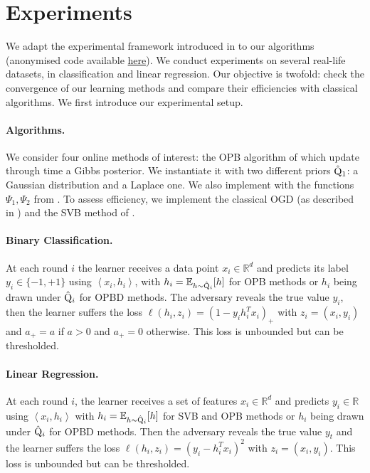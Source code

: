\section{Experiments}
\label{sec: experiments}

We adapt the experimental framework introduced in \citet[Sec.5]{cherief2019generalization} to our algorithms (anonymised code available \href{https://anonymous.4open.science/r/Online-PAC-Bayes-learning-044F}{here}). We conduct experiments on several real-life datasets, in classification and
linear regression. Our objective is twofold: check the convergence of our learning methods and compare their efficiencies with classical algorithms. We first introduce our experimental setup.

\paragraph{Algorithms.}
We consider four online methods of interest: the OPB algorithm of  which update through time a Gibbs posterior. We instantiate it with two different priors $\hat{\mathrm{Q}}_1$: a Gaussian distribution and a Laplace one. We also implement  with the functions $\Psi_1,\Psi_2$ from .
To assess efficiency, we implement the classical OGD (as described in \citealp[Alg. 1 of][]{zinkevich2003online}) and the SVB method of \citet{cherief2019generalization}.

\paragraph{Binary Classification.} At each round $i$ the learner receives a data point $x_{i} \in \mathbb{R}^{d}$ and predicts its label $y_{i} \in\{-1,+1\}$ using $\left\langle x_{i}, h_{i}\right\rangle$, with $h_i= \mathbb{E}_{h\sim \hat{\mathrm{Q}}_i}[h]$ for OPB methods or $h_i$ being drawn under $\hat{\mathrm{Q}}_i$ for OPBD methods.
The adversary reveals the true value $y_{i}$, then the learner suffers the loss $\ell(h_i,z_i)=\left(1-y_{i} h_{i}^{T} x_{i}\right)_{+}$ with $z_i=(x_i,y_i)$ and $a_{+}=a$ if $a>0$ and $a_{+}=0$ otherwise. This loss is unbounded but can be thresholded.


\paragraph{Linear Regression.} At each round $i$, the learner receives a set of features $x_{i} \in \mathbb{R}^{d}$ and predicts $y_{i} \in \mathbb{R}$ using $\left\langle x_{i}, h_{i}\right\rangle$ with $h_i= \mathbb{E}_{h\sim \hat{\mathrm{Q}}_i}[h]$ for SVB and OPB methods or $h_i$ being drawn under $\hat{\mathrm{Q}}_i$ for OPBD methods.
Then the adversary reveals the true value $y_{t}$ and the learner suffers the loss $\ell(h_i,z_i)=\left(y_{i}-h_{i}^{T} x_{i}\right)^{2}$ with $z_i=(x_i,y_i)$. This loss is unbounded but can be thresholded.

